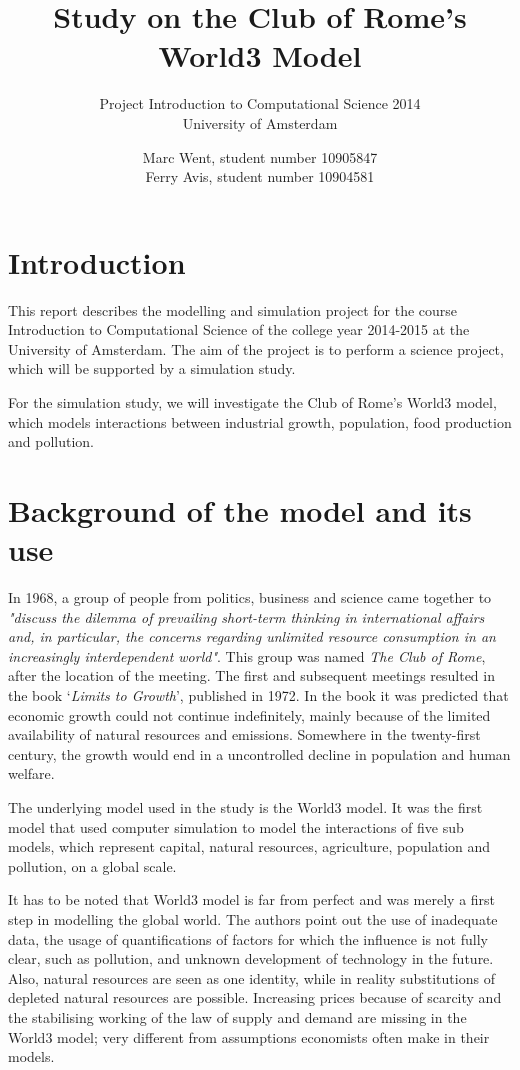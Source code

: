 \documentclass[10pt,a4paper]{scrartcl}
\title{Study on the Club of Rome's World3 Model}
\subtitle{Project Introduction to Computational Science 2014\\
University of Amsterdam}
\author{Marc Went, student number 10905847\\Ferry Avis, student number 10904581}
\begin{document}
\maketitle

\section*{Introduction}

This report describes the modelling and simulation project for the course Introduction to Computational Science of the college year 2014-2015 at the University of Amsterdam. The aim of the project is to perform a science project, which will be supported by a simulation study.

For the simulation study, we will investigate the Club of Rome's World3 model, which models interactions between industrial growth, population, food production and pollution. 

\section*{Background of the model and its use}

In 1968, a group of people from politics, business and science came together to \emph{"discuss the dilemma of prevailing short-term thinking in international affairs and, in particular, the concerns regarding unlimited resource consumption in an increasingly interdependent world"}. This group was named \emph{The Club of Rome}, after the location of the meeting. The first and subsequent meetings resulted in the book `\emph{Limits to Growth}', published in 1972. In the book it was predicted that economic growth could not continue indefinitely, mainly because of the limited availability of natural resources and emissions. Somewhere in the twenty-first century, the growth would end in a uncontrolled decline in population and human welfare.

The underlying model used in the study is the World3 model. It was the first model that used computer simulation to model the interactions of five sub models, which represent capital, natural resources, agriculture, population and pollution, on a global scale.

It has to be noted that World3 model is far from perfect and was merely a first step in modelling the global world. The authors point out the use of inadequate data, the usage of quantifications of factors for which the influence is not fully clear, such as pollution, and unknown development of technology in the future. Also, natural resources are seen as one identity, while in reality substitutions of depleted natural resources are possible. Increasing prices because of scarcity and the stabilising working of the law of supply and demand are missing in the World3 model; very different from assumptions economists often make in their models.
\end{document}
